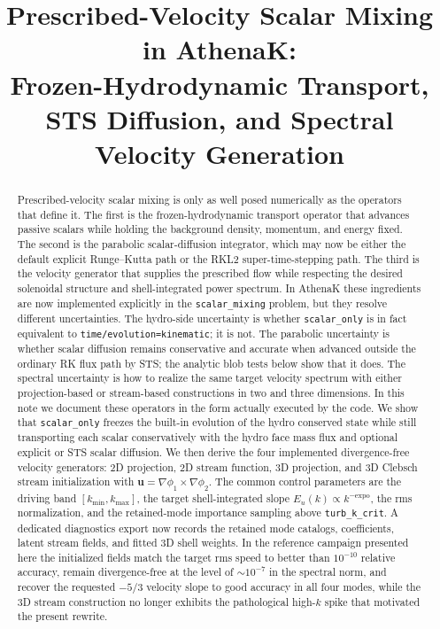 \documentclass[twocolumn]{aastex7}
\newcommand{\code}[1]{\texttt{#1}}
\newcommand{\SO}{\code{scalar\_only}\xspace}
\newcommand{\STS}{RKL2 super-time-stepping\xspace}
\begin{document}
\title{Prescribed-Velocity Scalar Mixing in AthenaK:\\
Frozen-Hydrodynamic Transport, STS Diffusion, and Spectral Velocity Generation}

\begin{abstract}
Prescribed-velocity scalar mixing is only as well posed numerically as the operators that define it. The first is the frozen-hydrodynamic transport operator that advances passive scalars while holding the background density, momentum, and energy fixed. The second is the parabolic scalar-diffusion integrator, which may now be either the default explicit Runge--Kutta path or the \STS path. The third is the velocity generator that supplies the prescribed flow while respecting the desired solenoidal structure and shell-integrated power spectrum. In AthenaK these ingredients are now implemented explicitly in the \code{scalar\_mixing} problem, but they resolve different uncertainties. The hydro-side uncertainty is whether \SO is in fact equivalent to \code{time/evolution=kinematic}; it is not. The parabolic uncertainty is whether scalar diffusion remains conservative and accurate when advanced outside the ordinary RK flux path by STS; the analytic blob tests below show that it does. The spectral uncertainty is how to realize the same target velocity spectrum with either projection-based or stream-based constructions in two and three dimensions. In this note we document these operators in the form actually executed by the code. We show that \SO freezes the built-in evolution of the hydro conserved state while still transporting each scalar conservatively with the hydro face mass flux and optional explicit or STS scalar diffusion. We then derive the four implemented divergence-free velocity generators: 2D projection, 2D stream function, 3D projection, and 3D Clebsch stream initialization with $\mathbf{u}=\nabla \phi_1 \times \nabla \phi_2$. The common control parameters are the driving band $\left[k_{\min},k_{\max}\right]$, the target shell-integrated slope $E_u(k)\propto k^{-\mathrm{expo}}$, the rms normalization, and the retained-mode importance sampling above \code{turb\_k\_crit}. A dedicated diagnostics export now records the retained mode catalogs, coefficients, latent stream fields, and fitted 3D shell weights. In the reference campaign presented here the initialized fields match the target rms speed to better than $10^{-10}$ relative accuracy, remain divergence-free at the level of ${\sim}10^{-7}$ in the spectral norm, and recover the requested $-5/3$ velocity slope to good accuracy in all four modes, while the 3D stream construction no longer exhibits the pathological high-$k$ spike that motivated the present rewrite.
\end{abstract}
\end{document}
